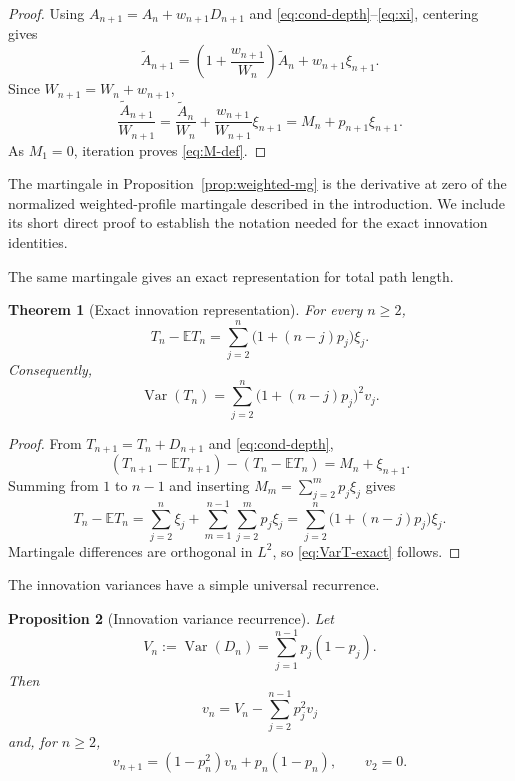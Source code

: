 \documentclass[11pt,a4paper]{article}
\newtheorem{theorem}{Theorem}[section]
\newtheorem{proposition}[theorem]{Proposition}
\newcommand{\E}{\mathbb{E}}
\newcommand{\Var}{\operatorname{Var}}
\newcommand{\1}{\mathbf{1}}
\begin{document}
\begin{proof}
Using $A_{n+1}=A_n+w_{n+1} D_{n+1}$ and
\eqref{eq:cond-depth}--\eqref{eq:xi}, centering gives
\[
\widetilde A_{n+1}
=
\left(1+\frac{w_{n+1}}{W_n}\right)\widetilde A_n
+
w_{n+1}\xi_{n+1}.
\]
Since $W_{n+1}=W_n+w_{n+1}$,
\[
\frac{\widetilde A_{n+1}}{W_{n+1}}
=
\frac{\widetilde A_n}{W_n}
+
\frac{w_{n+1}}{W_{n+1}}\xi_{n+1}
=
M_n+p_{n+1}\xi_{n+1}.
\]
As $M_1=0$, iteration proves \eqref{eq:M-def}.
\end{proof}


The martingale in Proposition~\ref{prop:weighted-mg} is the derivative at zero of the normalized weighted-profile martingale described in the introduction.
We include its short direct proof to establish the notation needed for the exact innovation identities.

The same martingale gives an exact representation for total path length.

\begin{theorem}[Exact innovation representation]\label{thm:innovation}
For every $n\ge2$,
\begin{equation}\label{eq:Tinnovation}
T_n-\E T_n
=
\sum_{j=2}^n
\bigl(1+(n-j)p_j\bigr)\xi_j.
\end{equation}
Consequently,
\begin{equation}\label{eq:VarT-exact}
\Var(T_n)
=
\sum_{j=2}^n
\bigl(1+(n-j)p_j\bigr)^2v_j.
\end{equation}
\end{theorem}

\begin{proof}
From $T_{n+1}=T_n+D_{n+1}$ and \eqref{eq:cond-depth},
\[
(T_{n+1}-\E T_{n+1})-(T_n-\E T_n)
=
M_n+\xi_{n+1}.
\]
Summing from $1$ to $n-1$ and inserting
$M_m=\sum_{j=2}^mp_j\xi_j$ gives
\[
T_n-\E T_n
=
\sum_{j=2}^n\xi_j
+
\sum_{m=1}^{n-1}\sum_{j=2}^mp_j\xi_j
=
\sum_{j=2}^n\bigl(1+(n-j)p_j\bigr)\xi_j.
\]
Martingale differences are orthogonal in $L^2$, so
\eqref{eq:VarT-exact} follows.
\end{proof}

The innovation variances have a simple universal recurrence.

\begin{proposition}[Innovation variance recurrence]\label{prop:vrec}
Let
\[
V_n:=\Var(D_n)
=
\sum_{j=1}^{n-1}p_j(1-p_j).
\]
Then
\begin{equation}\label{eq:v-identity}
v_n
=
V_n-\sum_{j=2}^{n-1}p_j^2v_j
\end{equation}
and, for $n\ge2$,
\begin{equation}\label{eq:v-rec}
v_{n+1}
=
(1-p_n^2)v_n+p_n(1-p_n),
\qquad v_2=0.
\end{equation}
\end{proposition}
\end{document}
